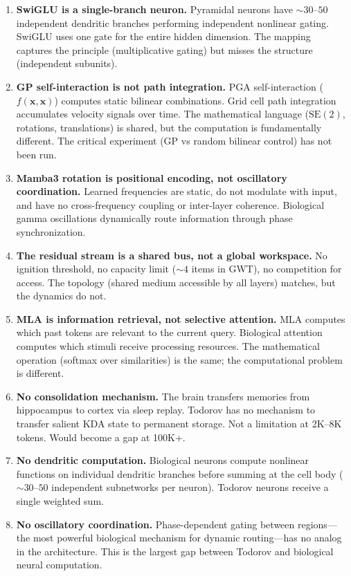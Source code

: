 \documentclass[11pt,a4paper]{article}
\begin{document}
\begin{enumerate}
\item \textbf{SwiGLU is a single-branch neuron.} Pyramidal neurons have ${\sim}30\text{--}50$ independent dendritic branches performing independent nonlinear gating. SwiGLU uses one gate for the entire hidden dimension. The mapping captures the principle (multiplicative gating) but misses the structure (independent subunits).

\item \textbf{GP self-interaction is not path integration.} PGA self-interaction ($f(\mathbf{x}, \mathbf{x})$) computes static bilinear combinations. Grid cell path integration accumulates velocity signals over time. The mathematical language ($\mathrm{SE}(2)$, rotations, translations) is shared, but the computation is fundamentally different. The critical experiment (GP vs random bilinear control) has not been run.

\item \textbf{Mamba3 rotation is positional encoding, not oscillatory coordination.} Learned frequencies are static, do not modulate with input, and have no cross-frequency coupling or inter-layer coherence. Biological gamma oscillations dynamically route information through phase synchronization.

\item \textbf{The residual stream is a shared bus, not a global workspace.} No ignition threshold, no capacity limit (${\sim}4$ items in GWT), no competition for access. The topology (shared medium accessible by all layers) matches, but the dynamics do not.

\item \textbf{MLA is information retrieval, not selective attention.} MLA computes which past tokens are relevant to the current query. Biological attention computes which stimuli receive processing resources. The mathematical operation (softmax over similarities) is the same; the computational problem is different.

\item \textbf{No consolidation mechanism.} The brain transfers memories from hippocampus to cortex via sleep replay. Todorov has no mechanism to transfer salient KDA state to permanent storage. Not a limitation at 2K--8K tokens. Would become a gap at 100K+.

\item \textbf{No dendritic computation.} Biological neurons compute nonlinear functions on individual dendritic branches before summing at the cell body (${\sim}30\text{--}50$ independent subnetworks per neuron). Todorov neurons receive a single weighted sum.

\item \textbf{No oscillatory coordination.} Phase-dependent gating between regions---the most powerful biological mechanism for dynamic routing---has no analog in the architecture. This is the largest gap between Todorov and biological neural computation.

\end{enumerate}
\end{document}
